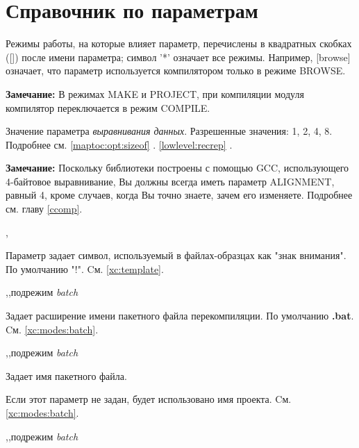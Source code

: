 \section{Справочник по параметрам}\label{opt:equ:list}

Режимы работы, на которые влияет параметр, перечислены в квадратных скобках
([])  после имени параметра; символ
'*' означает все режимы. Например, [browse]
означает, что параметр используется компилятором только в режиме BROWSE.

{\bf Замечание:} В режимах MAKE и PROJECT, при компиляции модуля компилятор
переключается в режим COMPILE.

\ifonline \else
\begin{description}
\fi

        \MLBegin{}\ModeC{}\MLEnd{} \inline

Значение параметра {\em выравнивания данных}. 
Разрешенные значения: 1, 2, 4, 8. 
Подробнее см.
        \ifgenc \ref{maptoc:opt:sizeof} \fi.
        \ifgencode \ref{lowlevel:recrep} \fi.

        \iflinux
        
{\bf Замечание:} Поскольку библиотеки \XDS{} 
построены с помощью
GCC, использующего 4-байтовое выравнивание, Вы должны всегда иметь
параметр ALIGNMENT, равный 4, кроме случаев, когда Вы точно знаете,
зачем его изменяете.
Подробнее см. главу \ref{ccomp}.
        \fi

        \MLBegin{}\ModeP{},\ModeG{}\MLEnd{}

Параметр задает символ, используемый в файлах-образцах как
"знак внимания". 
По умолчанию "!".
        Cм. \ref{xc:template}.

        \MLBegin{}\ModeM{},\ModeP{},{подрежим \em batch}\MLEnd{}

Задает расширение имени пакетного файла перекомпиляции.
По умолчанию {\bf .bat}.
        Cм. \ref{xc:modes:batch}.

        \MLBegin{}\ModeM{},\ModeP{},{подрежим \em batch}\MLEnd{}

Задает имя пакетного файла. 

Если этот параметр не задан, будет использовано имя проекта.
        Cм. \ref{xc:modes:batch}.

        \MLBegin{}\ModeM{},\ModeP{},{подрежим \em batch}\MLEnd{}


\end{description}
